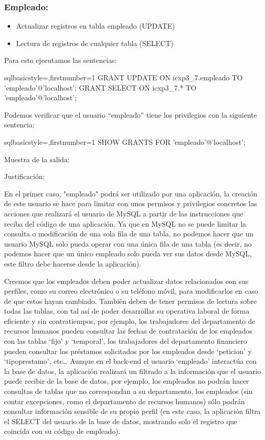 	\subsubsection*{Empleado:}
		\begin{itemize}
			\item Actualizar registros en tabla empleado (UPDATE)
			\item Lectura de registros de cualquier tabla (SELECT)
		\end{itemize}
	Para esto ejecutamos las sentencias:
	\begin{sourcecodep}[]{sql}{basicstyle={\fontsize{10}{10}\selectfont\ttfamily},firstnumber=1}{}
		GRANT UPDATE ON icxp3_7.empleado TO  'empleado'@'localhost';
		GRANT SELECT ON icxp3_7.* TO  'empleado'@'localhost';\end{sourcecodep}
	\newp Podemos verificar que el usuario “empleado” tiene los privilegios con la siguiente sentencia:
	\begin{sourcecodep}[]{sql}{basicstyle={\fontsize{10}{10}\selectfont\ttfamily},firstnumber=1}{}
		SHOW GRANTS FOR 'empleado'@'localhost';\end{sourcecodep}
	\newp Muestra de la salida:
	
	Justificación:
	
	\newp En el primer caso, "empleado" podrá ser utilizado por una aplicación, la creación de este usuario se hace para limitar con unos permisos y privilegios concretos las acciones que realizará el usuario de MySQL a partir de las instrucciones que reciba del código de una aplicación. Ya que en MySQL no se puede limitar la consulta o modificación de una sola fila de una tabla, no podemos hacer que un usuario MySQL solo pueda operar con una única fila de una tabla (es decir, no podemos hacer que un único empleado solo pueda ver sus datos desde MySQL, este filtro debe hacerse desde la aplicación).
	
	\newp Creemos que los empleados deben poder actualizar datos relacionados con sus perfiles, como su correo electrónico o su teléfono móvil, para modificarlos en caso de que estos hayan cambiado. También deben de tener permisos de lectura sobre todas las tablas, con tal así de poder desarrollar su operativa laboral de forma eficiente y sin contratiempos, por ejemplo, los trabajadores del departamento de recursos humanos pueden consultar las fechas de contratación de los empleados con las tablas ‘fijo’ y ‘temporal’, los trabajadores del departamento financiero pueden consultar los préstamos solicitados por los empleados desde ‘peticion’ y ‘tipoprestamo’, etc… Aunque en el back-end el usuario ‘empleado’ interactúa con la base de datos, la aplicación realizará un filtrado a la información que el usuario puede recibir de la base de datos, por ejemplo, los empleados no podrán hacer consultas de tablas que no correspondan a su departamento, los empleados (sin contar excepciones, como el departamento de recursos humanos) sólo podrán consultar información sensible de su propio perfil (en este caso, la aplicación filtra el SELECT del usuario de la base de datos, mostrando solo el registro que coincida con su código de empleado).
	
